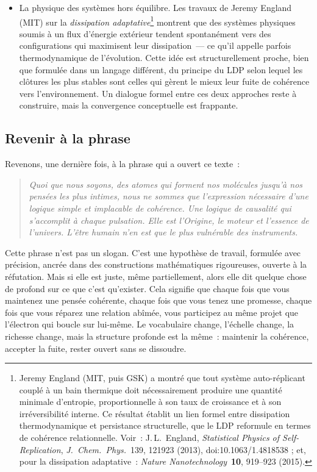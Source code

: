 \documentclass[12pt, a4paper, openright]{book}
\begin{document}
\begin{itemize}
\item La physique des systèmes hors équilibre. Les travaux de Jeremy England (MIT) sur la \emph{dissipation adaptative}\footnote{Jeremy England (MIT, puis GSK) a montré que tout système auto-réplicant couplé à un bain thermique doit nécessairement produire une quantité minimale d'entropie, proportionnelle à son taux de croissance et à son irréversibilité interne. Ce résultat établit un lien formel entre dissipation thermodynamique et persistance structurelle, que le LDP reformule en termes de cohérence relationnelle. Voir~: J.\,L.~England, \textit{Statistical Physics of Self-Replication}, \textit{J.~Chem.~Phys.}~139, 121923 (2013), doi:10.1063/1.4818538 ; et, pour la dissipation adaptative~: \textit{Nature Nanotechnology}~\textbf{10}, 919--923 (2015).} montrent que des systèmes physiques soumis à un flux d'énergie extérieur tendent spontanément vers des configurations qui maximisent leur dissipation~--- ce qu'il appelle parfois \og thermodynamique de l'évolution\fg{}. Cette idée est structurellement proche, bien que formulée dans un langage différent, du principe du LDP selon lequel les clôtures les plus stables sont celles qui gèrent le mieux leur fuite de cohérence vers l'environnement. Un dialogue formel entre ces deux approches reste à construire, mais la convergence conceptuelle est frappante.

\end{itemize}

\subsection*{Revenir à la phrase}

Revenons, une dernière fois, à la phrase qui a ouvert ce texte~:

\begin{quote}
\itshape Quoi que nous soyons, des atomes qui forment nos molécules jusqu'à nos pensées les plus intimes, nous ne sommes que l'expression nécessaire d'une logique simple et implacable de cohérence. Une logique de causalité qui s'accomplit à chaque pulsation. Elle est l'Origine, le moteur et l'essence de l'univers. L'être humain n'en est que le plus vulnérable des instruments.
\end{quote}

Cette phrase n'est pas un slogan. C'est une hypothèse de travail, formulée avec précision, ancrée dans des constructions mathématiques rigoureuses, ouverte à la réfutation. Mais si elle est juste, même partiellement, alors elle dit quelque chose de profond sur ce que c'est qu'exister. Cela signifie que chaque fois que vous maintenez une pensée cohérente, chaque fois que vous tenez une promesse, chaque fois que vous réparez une relation abîmée, vous participez au même projet que l'électron qui boucle sur lui-même. Le vocabulaire change, l'échelle change, la richesse change, mais la structure profonde est la même~: maintenir la cohérence, accepter la fuite, rester ouvert sans se dissoudre.
\end{document}
